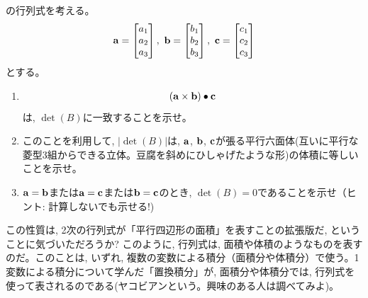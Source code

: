 \begin{exq}\label{q:univ_det3D3} の行列式を考える。
\begin{eqnarray*}
{\bf a}=\begin{bmatrix}a_1\\
a_2\\
a_3\\
\end{bmatrix},\,\,
{\bf b}=\begin{bmatrix}b_1\\
b_2\\
b_3\\
\end{bmatrix}
,\,\,
{\bf c}=\begin{bmatrix}c_1\\
c_2\\
c_3\\
\end{bmatrix}
\end{eqnarray*}
とする。
\begin{enumerate}
\item 
\begin{eqnarray}
({\bf a}\times{\bf b})\bullet{\bf c}\label{eq:scalar3product00}
\end{eqnarray}
は, $\det(B)$に一致することを示せ。
\item このことを利用して, $|\det (B)|$は, ${\bf a}$, ${\bf b}$, ${\bf c}$が張る平行六面体(互いに平行な菱型3組からできる立体。豆腐を斜めにひしゃげたような形)の体積に等しいことを示せ。
\item ${\bf a}={\bf b}$または${\bf a}={\bf c}$または${\bf b}={\bf c}$のとき, $\det(B)=0$であることを示せ（ヒント: 計算しないでも示せる!)
\end{enumerate}
この性質は, 2次の行列式が「平行四辺形の面積」を表すことの拡張版だ, ということに気づいただろうか? このように, 行列式は, 面積や体積のようなものを表すのだ。このことは, いずれ, 複数の変数による積分（面積分や体積分）で使う。1変数による積分について学んだ「置換積分」が, 面積分や体積分では, 行列式を使って表されるのである(ヤコビアンという。興味のある人は調べてみよ)。
\end{exq}

